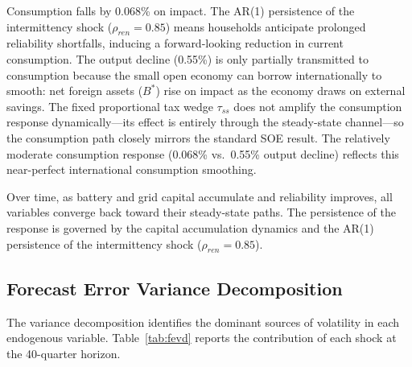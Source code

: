 \documentclass[12pt, a4paper]{article}
\begin{document}
Consumption falls by 0.068\% on impact. The AR(1) persistence of the intermittency shock ($\rho_{ren}=0.85$) means households anticipate prolonged reliability shortfalls, inducing a forward-looking reduction in current consumption. The output decline (0.55\%) is only partially transmitted to consumption because the small open economy can borrow internationally to smooth: net foreign assets ($B^*$) rise on impact as the economy draws on external savings. The fixed proportional tax wedge $\tau_{ss}$ does not amplify the consumption response dynamically---its effect is entirely through the steady-state channel---so the consumption path closely mirrors the standard SOE result. The relatively moderate consumption response (0.068\% vs.\ 0.55\% output decline) reflects this near-perfect international consumption smoothing.

Over time, as battery and grid capital accumulate and reliability improves, all variables converge back toward their steady-state paths. The persistence of the response is governed by the capital accumulation dynamics and the AR(1) persistence of the intermittency shock ($\rho_{ren} = 0.85$).

\subsection{Forecast Error Variance Decomposition} \label{subsec:fevd}

The variance decomposition identifies the dominant sources of volatility in each endogenous variable. Table~\ref{tab:fevd} reports the contribution of each shock at the 40-quarter horizon.
\end{document}
